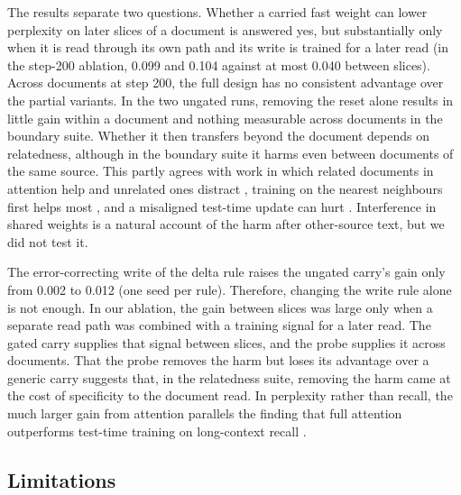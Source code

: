 \documentclass[10pt]{article} %
\begin{document}
The results separate two questions. Whether a carried fast weight can lower perplexity on later slices of a document is answered yes, but substantially only when it is read through its own path and its write is trained for a later read (in the step-200 ablation, 0.099 and 0.104 against at most 0.040 between slices). Across documents at step 200, the full design has no consistent advantage over the partial variants. In the two ungated runs, removing the reset alone results in little gain within a document and nothing measurable across documents in the boundary suite. Whether it then transfers beyond the document depends on relatedness, although in the boundary suite it harms even between documents of the same source. This partly agrees with work in which related documents in attention help and unrelated ones distract \citep{zhao2024analysing}, training on the nearest neighbours first helps most \citep{hardt2024test}, and a misaligned test-time update can hurt \citep{gandelsman2022ttt}. Interference in shared weights \citep{french1999catastrophic,kirkpatrick2017overcoming} is a natural account of the harm after other-source text, but we did not test it.

The error-correcting write of the delta rule \citep{schlag2021linear,yang2024deltanet} raises the ungated carry's gain only from 0.002 to 0.012 (one seed per rule). Therefore, changing the write rule alone is not enough. In our ablation, the gain between slices was large only when a separate read path was combined with a training signal for a later read. The gated carry supplies that signal between slices, and the probe supplies it across documents. That the probe removes the harm but loses its advantage over a generic carry suggests that, in the relatedness suite, removing the harm came at the cost of specificity to the document read. In perplexity rather than recall, the much larger gain from attention parallels the finding that full attention outperforms test-time training on long-context recall \citep{tandon2025endtoend}.

\subsection{Limitations}
\end{document}
